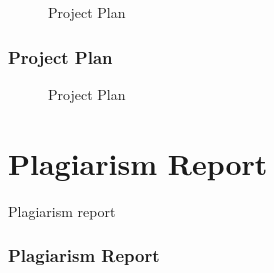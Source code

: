 \documentclass[oneside,a4paper,12pt]{book}
\begin{document}
\begin{appendices}
\begin{center}
\begin{figure}[!htbp]
		 \caption{Project Plan}
	  \label{fig:Project Plan}
	\end{figure}
\end{center}

\newpage

\subsection{Project Plan}
 \begin{center}
	\begin{figure}[!htbp]
		\centering
		
		 \caption{Project Plan}
	  \label{fig:Project Plan}
	\end{figure}
\end{center}









\chapter{Plagiarism Report}
Plagiarism report
\subsection{Plagiarism Report}
 \begin{center}
	\begin{figure}[!htbp]
		\centering
		

\end{figure}
\end{center}
\end{appendices}
\end{document}

